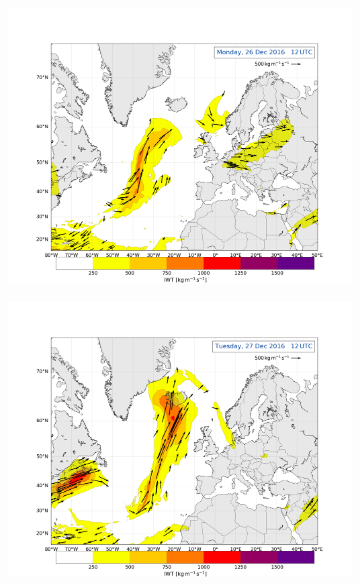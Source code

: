 \begin{figure}[t!]
	\begin{subfigure}[b]{0.49\textwidth}
		\includegraphics[trim={4.2cm 3.9cm 4.3cm 5.1cm},clip,
		width=\textwidth]{./fig_Atm_Riv/20161226_12}
		\caption{}\label{fig:AR26}
	\end{subfigure}
	\begin{subfigure}[b]{0.49\textwidth}
		\includegraphics[trim={4.2cm 3.9cm 4.3cm 5.1cm},clip,
		width=\textwidth]{./fig_Atm_Riv/20161227_12}
		\caption{}\label{fig:AR27}
	\end{subfigure}
	\begin{subfigure}[b]{\textwidth}

\end{subfigure}
\end{figure}
